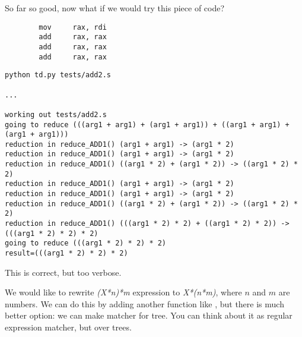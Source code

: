 So far so good, now what if we would try this piece of code?

\begin{lstlisting}
        mov     rax, rdi
        add     rax, rax
        add     rax, rax
        add     rax, rax
\end{lstlisting}

\begin{lstlisting}
python td.py tests/add2.s

...

working out tests/add2.s
going to reduce (((arg1 + arg1) + (arg1 + arg1)) + ((arg1 + arg1) + (arg1 + arg1)))
reduction in reduce_ADD1() (arg1 + arg1) -> (arg1 * 2)
reduction in reduce_ADD1() (arg1 + arg1) -> (arg1 * 2)
reduction in reduce_ADD1() ((arg1 * 2) + (arg1 * 2)) -> ((arg1 * 2) * 2)
reduction in reduce_ADD1() (arg1 + arg1) -> (arg1 * 2)
reduction in reduce_ADD1() (arg1 + arg1) -> (arg1 * 2)
reduction in reduce_ADD1() ((arg1 * 2) + (arg1 * 2)) -> ((arg1 * 2) * 2)
reduction in reduce_ADD1() (((arg1 * 2) * 2) + ((arg1 * 2) * 2)) -> (((arg1 * 2) * 2) * 2)
going to reduce (((arg1 * 2) * 2) * 2)
result=(((arg1 * 2) * 2) * 2)
\end{lstlisting}

This is correct, but too verbose.

We would like to rewrite \textit{(X*n)*m} expression to \textit{X*(n*m)}, where $n$ and $m$ are numbers.
We can do this by adding another function like , but there is much better option:
we can make matcher for tree.
You can think about it as regular expression matcher, but over trees.

